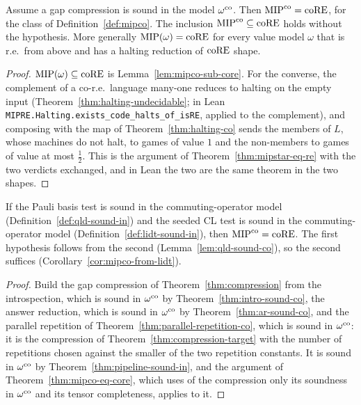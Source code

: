 \begin{theorem}[$\MIPco = \coRE$, from co-soundness]
\label{thm:mipco-eq-core}
\leanok
Assume a gap compression is sound in the model $\omega^{\mathrm{co}}$. Then $\MIPco = \coRE$, for the class of Definition~\ref{def:mipco}. The inclusion
$\mathrm{MIP}^{\mathrm{co}} \subseteq \mathrm{coRE}$ holds without the hypothesis. More generally
$\mathrm{MIP}(\omega) = \mathrm{coRE}$ for every value model $\omega$ that is r.e.\ from above and has a
halting reduction of $\mathrm{coRE}$ shape.
\end{theorem}

\begin{proof}
\leanok
$\mathrm{MIP}(\omega) \subseteq \mathrm{coRE}$ is Lemma~\ref{lem:mipco-sub-core}. For the converse, the
complement of a co-r.e.\ language many-one reduces to halting on the empty input
(Theorem~\ref{thm:halting-undecidable}; in Lean
\texttt{MIPRE.Halting.exists\_code\_halts\_of\_isRE}, applied to the complement), and
composing with the map of Theorem~\ref{thm:halting-co} sends the members of $L$, whose
machines do not halt, to games of value $1$ and the non-members to games of value at most
$\frac12$. This is the argument of Theorem~\ref{thm:mipstar-eq-re} with the two verdicts
exchanged, and in Lean the two are the same theorem in the two shapes.
\end{proof}

\begin{corollary}[$\MIPco = \coRE$, from the co-soundness of the Pauli basis test and of the low-individual-degree test]
\label{cor:mipco-from-stages}
\leanok
If the Pauli basis test is sound in the commuting-operator model
(Definition~\ref{def:qld-sound-in}) and the seeded CL test is sound in the commuting-operator
model (Definition~\ref{def:lidt-sound-in}), then $\MIPco = \coRE$. The first hypothesis follows
from the second (Lemma~\ref{lem:qld-sound-co}), so the second suffices
(Corollary~\ref{cor:mipco-from-lidt}).
\end{corollary}

\begin{proof}
\leanok
Build the gap compression of Theorem~\ref{thm:compression} from the introspection, which is sound
in $\omega^{\mathrm{co}}$ by Theorem~\ref{thm:intro-sound-co}, the answer reduction, which is sound in
$\omega^{\mathrm{co}}$ by Theorem~\ref{thm:ar-sound-co}, and the parallel
repetition of Theorem~\ref{thm:parallel-repetition-co}, which is sound in $\omega^{\mathrm{co}}$: it is the
compression of Theorem~\ref{thm:compression-target} with the number of repetitions chosen against
the smaller of the two repetition constants. It is sound in $\omega^{\mathrm{co}}$ by
Theorem~\ref{thm:pipeline-sound-in}, and the argument of Theorem~\ref{thm:mipco-eq-core}, which
uses of the compression only its soundness in $\omega^{\mathrm{co}}$ and its tensor completeness, applies to
it.
\end{proof}

